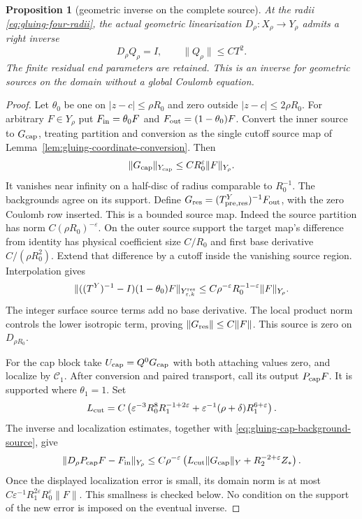 \documentclass[11pt]{amsart}
\newtheorem{proposition}[theorem]{Proposition}
\theoremstyle{definition}
\theoremstyle{remark}
\theoremstyle{plain}
\begin{document}
\begin{proposition}[geometric inverse on the complete source]
\label{prop:gluing-geometric-inverse}
At the radii \eqref{eq:gluing-four-radii}, the actual geometric
linearization $D_\rho:X_\rho\to Y_\rho$ admits a right inverse
\begin{equation}\label{eq:gluing-geometric-inverse}
                         D_\rho Q_\rho=I,\qquad \|Q_\rho\|\leq CT^2.
\end{equation}
The finite residual end parameters are retained. This is an inverse
for geometric sources on the domain without a global Coulomb equation.
\end{proposition}

\begin{proof}
Let $\theta_0$ be one on $|z-c|\leq\rho R_0$ and zero
outside $|z-c|\leq2\rho R_0$. For arbitrary $F\in Y_\rho$
put $F_{\rm in}=\theta_0F$ and $F_{\rm out}=(1-\theta_0)F$.
Convert the inner source to $G_{\rm cap}$, treating partition
and conversion as the single cutoff source map of
Lemma~\ref{lem:gluing-coordinate-conversion}. Then
\[
             \|G_{\rm cap}\|_{Y_{\rm cap}}
                                  \leq CR_0^\varepsilon\|F\|_{Y_\rho}.
\]
It vanishes near infinity on a half-disc of radius comparable to
$R_0^{-1}$. The backgrounds agree on its support. Define
$G_{\rm res}=(T^Y_{{\rm pre},{\rm res}})^{-1}F_{\rm out}$,
with the zero Coulomb row inserted. This is a bounded source map.
Indeed the source partition has norm $C(\rho R_0)^{-\varepsilon}$.
On the outer source support the target map's difference from identity
has physical coefficient size $C/R_0$ and first base derivative
$C/(\rho R_0^2)$. Extend that difference by a cutoff inside
the vanishing source region. Interpolation gives
\[
 \|((T^Y)^{-1}-I)(1-\theta_0)F\|_{Y^{\rm res}_{\varepsilon,k}}
             \leq C\rho^{-\varepsilon}R_0^{-1-\varepsilon}\|F\|_{Y_\rho}.
\]
The integer surface source terms add no base derivative. The local
product norm controls the lower isotropic term, proving
$\|G_{\rm res}\|\leq C\|F\|$. This source is zero on
$D_{\rho R_0}$.

For the cap block take $U_{\rm cap}=Q^0G_{\rm cap}$ with
both attaching values zero, and localize by $\mathcal C_1$.
After conversion and paired transport, call its output $P_{\rm cap}F$.
It is supported where $\theta_1=1$. Set
\[
 L_{\rm cut}=C\left(\varepsilon^{-3}R_0^8R_1^{-1+2\varepsilon}
                 +\varepsilon^{-1}(\rho+\delta)R_1^{6+\varepsilon}\right).
\]
The inverse and localization estimates, together with
\eqref{eq:gluing-cap-background-source}, give
\begin{equation}\label{eq:gluing-cap-block-error}
 \|D_\rho P_{\rm cap}F-F_{\rm in}\|_{Y_\rho}
 \leq C\rho^{-\varepsilon}
       \left(L_{\rm cut}\|G_{\rm cap}\|_Y
                                  +R_2^{-2+\varepsilon}Z_*\right).
\end{equation}
Once the displayed localization error is small, its domain norm is
at most $C\varepsilon^{-1}R_1^{2\varepsilon}R_0^\varepsilon\|F\|$.
This smallness is checked below. No condition on the support of the
new error is imposed on the eventual inverse.


\end{proof}
\end{document}
